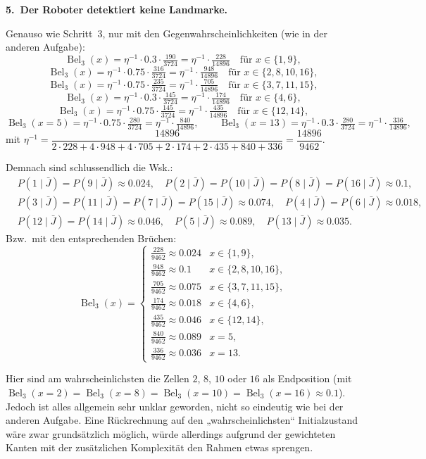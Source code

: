 \documentclass[11pt,a4paper]{article}
\newcommand{\Bel}{\operatorname{Bel}}
\begin{document}
\textbf{5.\ Der Roboter detektiert keine Landmarke.}

Genauso wie Schritt~3, nur mit den Gegenwahrscheinlichkeiten (wie in der anderen Aufgabe):
\[
  \Bel_3(x) = \eta^{-1}\cdot 0.3\cdot\tfrac{190}{3724} = \eta^{-1}\cdot\tfrac{228}{14896}
  \quad\text{für } x\in\{1,9\},
\]
\[
  \Bel_3(x) = \eta^{-1}\cdot 0.75\cdot\tfrac{316}{3724} = \eta^{-1}\cdot\tfrac{948}{14896}
  \quad\text{für } x\in\{2,8,10,16\},
\]
\[
  \Bel_3(x) = \eta^{-1}\cdot 0.75\cdot\tfrac{235}{3724} = \eta^{-1}\cdot\tfrac{705}{14896}
  \quad\text{für } x\in\{3,7,11,15\},
\]
\[
  \Bel_3(x) = \eta^{-1}\cdot 0.3\cdot\tfrac{145}{3724} = \eta^{-1}\cdot\tfrac{174}{14896}
  \quad\text{für } x\in\{4,6\},
\]
\[
  \Bel_3(x) = \eta^{-1}\cdot 0.75\cdot\tfrac{145}{3724} = \eta^{-1}\cdot\tfrac{435}{14896}
  \quad\text{für } x\in\{12,14\},
\]
\[
  \Bel_3(x=5) = \eta^{-1}\cdot 0.75\cdot\tfrac{280}{3724} = \eta^{-1}\cdot\tfrac{840}{14896},
  \qquad
  \Bel_3(x=13) = \eta^{-1}\cdot 0.3\cdot\tfrac{280}{3724} = \eta^{-1}\cdot\tfrac{336}{14896},
\]
mit $\eta^{-1} = \dfrac{14896}{2\cdot 228 + 4\cdot 948 + 4\cdot 705 + 2\cdot 174 + 2\cdot 435 + 840 + 336}
= \dfrac{14896}{9462}$.

Demnach sind schlussendlich die Wsk.:
\[
\begin{aligned}
  &P(1\mid\bar J)=P(9\mid\bar J)\approx 0.024, \quad
  P(2\mid\bar J)=P(10\mid\bar J)=P(8\mid\bar J)=P(16\mid\bar J)\approx 0.1, \\[0.2em]
  &P(3\mid\bar J)=P(11\mid\bar J)=P(7\mid\bar J)=P(15\mid\bar J)\approx 0.074, \quad
  P(4\mid\bar J)=P(6\mid\bar J)\approx 0.018, \\[0.2em]
  &P(12\mid\bar J)=P(14\mid\bar J)\approx 0.046, \quad
  P(5\mid\bar J)\approx 0.089, \quad
  P(13\mid\bar J)\approx 0.035.
\end{aligned}
\]
Bzw.\ mit den entsprechenden Brüchen:
\[
  \Bel_3(x) =
  \begin{cases}
    \tfrac{228}{9462}\approx 0.024 & x\in\{1,9\},\\[0.3em]
    \tfrac{948}{9462}\approx 0.1   & x\in\{2,8,10,16\},\\[0.3em]
    \tfrac{705}{9462}\approx 0.075 & x\in\{3,7,11,15\},\\[0.3em]
    \tfrac{174}{9462}\approx 0.018 & x\in\{4,6\},\\[0.3em]
    \tfrac{435}{9462}\approx 0.046 & x\in\{12,14\},\\[0.3em]
    \tfrac{840}{9462}\approx 0.089 & x=5,\\[0.3em]
    \tfrac{336}{9462}\approx 0.036 & x=13.
  \end{cases}
\]

Hier sind am wahrscheinlichsten die Zellen $2$, $8$, $10$ oder $16$ als Endposition
(mit $\Bel_3(x=2)=\Bel_3(x=8)=\Bel_3(x=10)=\Bel_3(x=16)\approx 0.1$). Jedoch ist alles allgemein
sehr unklar geworden, nicht so eindeutig wie bei der anderen Aufgabe. Eine Rückrechnung auf den
„wahrscheinlichsten“ Initialzustand wäre zwar grundsätzlich möglich, würde allerdings aufgrund der
gewichteten Kanten mit der zusätzlichen Komplexität den Rahmen etwas sprengen.
\end{document}
